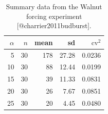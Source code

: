 \begin{table}[t]
\centering
\caption{Summary data from the Walnut forcing experiment [@charrier2011budburst].}
\label{tab:walnut_forcing}
\begin{tabular}{rrrrr}
\toprule
$\alpha$ & $n$ & mean & sd & $\mathrm{cv}^2$ \\
\midrule
 5  & 30 & 178 & 27.28 & 0.0236 \\
10  & 30 &  88 & 12.44 & 0.0199 \\
15  & 30 &  39 & 11.33 & 0.0831 \\
20  & 30 &  26 &  7.67 & 0.0851 \\
25  & 30 &  20 &  4.45 & 0.0480 \\
\bottomrule
\end{tabular}
\end{table}
